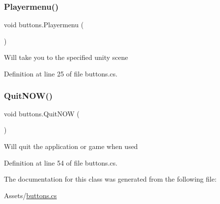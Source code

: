 \mbox{\label{classbuttons_a2a52796de295f9cc1a78a8504d4d6d17}} 
\subsubsection{\texorpdfstring{Playermenu()}{Playermenu()}}
{\footnotesize\ttfamily void buttons.\+Playermenu (\begin{DoxyParamCaption}{ }\end{DoxyParamCaption})}

Will take you to the specified unity scene 

Definition at line 25 of file buttons.\+cs.

\mbox{\label{classbuttons_a77363e359766278453654844761de109}} 
\subsubsection{\texorpdfstring{QuitNOW()}{QuitNOW()}}
{\footnotesize\ttfamily void buttons.\+Quit\+N\+OW (\begin{DoxyParamCaption}{ }\end{DoxyParamCaption})}

Will quit the application or game when used 

Definition at line 54 of file buttons.\+cs.



The documentation for this class was generated from the following file\+:\begin{DoxyCompactItemize}
\item 
Assets/\mbox{\hyperlink{buttons_8cs}{buttons.\+cs}}\end{DoxyCompactItemize}
